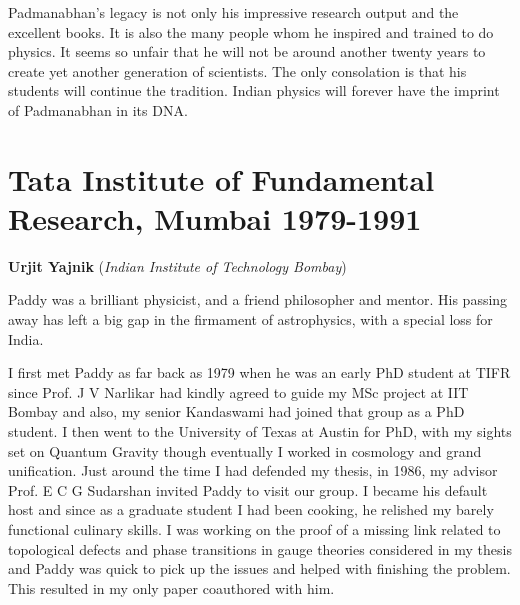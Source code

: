 \documentclass[prd, preprint, longbibliography, 11pt]{revtex4-1}
\begin{document}
Padmanabhan's legacy is not only his impressive research output and the excellent books. It is also the many people whom he inspired and trained to do physics. It seems so unfair that he will not be around another twenty years to create yet another generation of scientists. The only consolation is that  his students will continue the tradition. Indian physics will forever have the imprint of Padmanabhan in its DNA.



\section{Tata Institute of Fundamental Research, Mumbai 1979-1991}
\smallskip
\centerline{{\bf Urjit Yajnik} ({\it Indian Institute of Technology Bombay})}
\medskip
{}

\noindent Paddy was a brilliant physicist, and a friend philosopher and mentor. His passing away has left a big gap in the firmament of astrophysics, with a special loss for India. 

I first met Paddy as far back as 1979 when he was an early PhD student at TIFR since Prof. J V Narlikar had kindly agreed to guide my MSc project at IIT Bombay and also, my senior Kandaswami had joined that group as a PhD student. I then went to the University of Texas at Austin for PhD, with my sights set on Quantum Gravity though eventually I worked in cosmology and grand unification. Just around the time I had defended my thesis, in 1986, my advisor Prof. E C G Sudarshan invited Paddy to visit our group. I became his default host and since as a graduate student I had been cooking, he relished my barely functional culinary skills. I was working on the proof of a missing link related to topological defects and phase transitions in gauge theories considered in my thesis and Paddy was quick to pick up the issues and helped with finishing the problem. This resulted in my only paper coauthored with him. 
\end{document}
